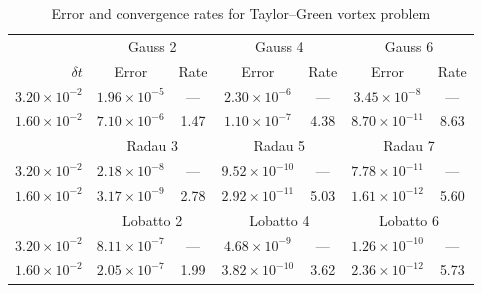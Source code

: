 \documentclass[review]{siamart}
\begin{document}
\begin{table}
	\centering
	\caption{Error and convergence rates for Taylor--Green vortex problem}
	\label{tab:tgv-errors}
	\begin{tabular}{r|cccccc}
		\toprule
		& \multicolumn{2}{c}{Gauss 2} & \multicolumn{2}{c}{Gauss 4} & \multicolumn{2}{c}{Gauss 6}\\
		$\delta t$ & Error & Rate & Error & Rate & Error & Rate\\
		\midrule
		$3.20\times 10^{-2}$ & $1.96 \times 10^{-5}$ & --- & $2.30 \times 10^{-6}$ & --- & $3.45 \times 10^{-8}$ & --- \\
		$1.60\times 10^{-2}$ & $7.10 \times 10^{-6}$ & 1.47 & $1.10 \times 10^{-7}$ & 4.38 & $8.70 \times 10^{-11}$ & 8.63 \\
		\midrule
		& \multicolumn{2}{c}{Radau 3} & \multicolumn{2}{c}{Radau 5} & \multicolumn{2}{c}{Radau 7}\\
		\midrule
		$3.20\times 10^{-2}$ & $2.18 \times 10^{-8}$ & --- & $9.52 \times 10^{-10}$ & --- & $7.78 \times 10^{-11}$ & --- \\
		$1.60\times 10^{-2}$ & $3.17 \times 10^{-9}$ & 2.78 & $2.92 \times 10^{-11}$ & 5.03 & $1.61 \times 10^{-12}$ & 5.60 \\
		\midrule
		& \multicolumn{2}{c}{Lobatto 2} & \multicolumn{2}{c}{Lobatto 4} & \multicolumn{2}{c}{Lobatto 6}\\
		\midrule
		$3.20\times 10^{-2}$ & $8.11 \times 10^{-7}$ & --- & $4.68 \times 10^{-9}$ & --- & $1.26 \times 10^{-10}$ & --- \\
		$1.60\times 10^{-2}$ & $2.05 \times 10^{-7}$ & 1.99 & $3.82 \times 10^{-10}$ & 3.62 & $2.36 \times 10^{-12}$ & 5.73 \\
		\bottomrule
	\end{tabular}
\end{table}
\end{document}
